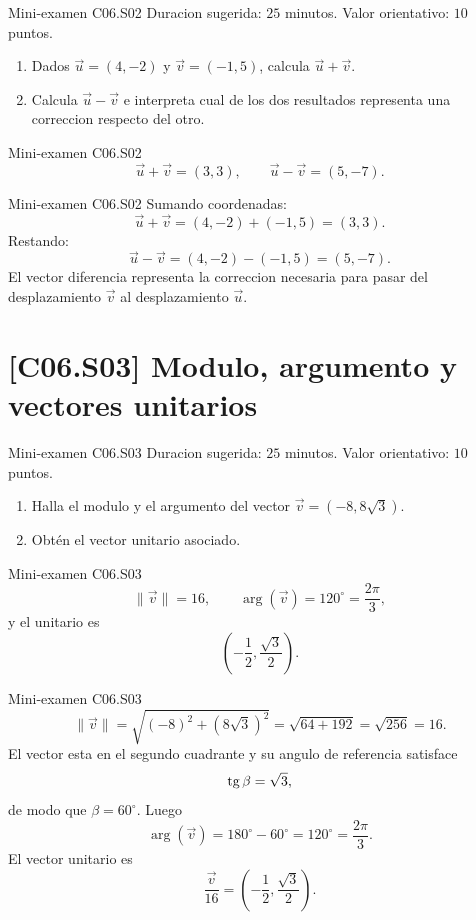 \begin{exambrief}{Mini-examen C06.S02}
Duracion sugerida: \(25\) minutos. Valor orientativo: \(10\) puntos.
\begin{enumerate}
  \item Dados \(\vec u=(4,-2)\) y \(\vec v=(-1,5)\), calcula \(\vec u+\vec v\).
  \item Calcula \(\vec u-\vec v\) e interpreta cual de los dos resultados representa una
  correccion respecto del otro.
\end{enumerate}
\end{exambrief}

\begin{shortanswer}{Mini-examen C06.S02}
\[
\vec u+\vec v=(3,3),
\qquad
\vec u-\vec v=(5,-7).
\]
\end{shortanswer}

\begin{fullsolution}{Mini-examen C06.S02}
Sumando coordenadas:
\[
\vec u+\vec v=(4,-2)+(-1,5)=(3,3).
\]
Restando:
\[
\vec u-\vec v=(4,-2)-(-1,5)=(5,-7).
\]
El vector diferencia representa la correccion necesaria para pasar del desplazamiento \(\vec v\)
al desplazamiento \(\vec u\).
\end{fullsolution}

\section{[C06.S03] Modulo, argumento y vectores unitarios}

\begin{exambrief}{Mini-examen C06.S03}
Duracion sugerida: \(25\) minutos. Valor orientativo: \(10\) puntos.
\begin{enumerate}
  \item Halla el modulo y el argumento del vector \(\vec v=(-8,8\sqrt3)\).
  \item Obtén el vector unitario asociado.
\end{enumerate}
\end{exambrief}

\begin{shortanswer}{Mini-examen C06.S03}
\[
\|\vec v\|=16,
\qquad
\arg(\vec v)=120^\circ=\frac{2\pi}{3},
\]
y el unitario es
\[
\left(-\frac12,\frac{\sqrt3}{2}\right).
\]
\end{shortanswer}

\begin{fullsolution}{Mini-examen C06.S03}
\[
\|\vec v\|=\sqrt{(-8)^2+(8\sqrt3)^2}=\sqrt{64+192}=\sqrt{256}=16.
\]
El vector esta en el segundo cuadrante y su angulo de referencia satisface
\[
\operatorname{tg}\beta=\sqrt3,
\]
de modo que \(\beta=60^\circ\). Luego
\[
\arg(\vec v)=180^\circ-60^\circ=120^\circ=\frac{2\pi}{3}.
\]
El vector unitario es
\[
\frac{\vec v}{16}=\left(-\frac12,\frac{\sqrt3}{2}\right).
\]
\end{fullsolution}

